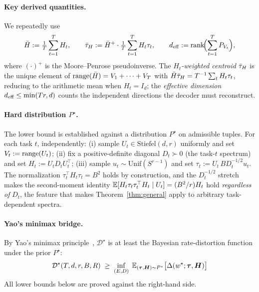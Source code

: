 \paragraph{Key derived quantities.} We repeatedly use
\begin{equation}\label{eq:derived}
  \bar H := \tfrac1T\sum_{t=1}^T H_t,\qquad
  \bar{\tau}_H := \bar H^+\cdot \tfrac1T\sum_{t=1}^T H_t\tau_t,\qquad
  d_{\mathrm{eff}} := \operatorname{rank}\!\Bigl(\sum_{t=1}^T P_{V_t}\Bigr),
\end{equation}
where $(\cdot)^+$ is the Moore--Penrose pseudoinverse. The
\emph{$H_t$-weighted centroid} $\bar{\tau}_H$ is the unique element of
$\operatorname{range}(\bar H) = V_1 + \cdots + V_T$ with $\bar H \bar{\tau}_H =
T^{-1}\sum_t H_t \tau_t$, reducing to the arithmetic mean when
$H_t = I_d$; the \emph{effective dimension} $d_{\mathrm{eff}} \leq \min(Tr, d)$
counts the independent directions the decoder must reconstruct.

\paragraph{Hard distribution $P^\star$.} The lower bound is established
against a distribution $P^\star$ on admissible tuples. For each task
$t$, independently: (i) sample $U_t \in \mathrm{Stiefel}(d, r)$
uniformly and set $V_t := \operatorname{range}(U_t)$; (ii) fix a positive-definite
diagonal $D_t \succ 0$ (the task-$t$ spectrum) and set $H_t := U_t D_t
U_t^\top$; (iii) sample $u_t \sim \mathrm{Unif}(S^{r-1})$ and set
$\tau_t := U_t\, B D_t^{-1/2} u_t$. The normalization
$\tau_t^\top H_t \tau_t = B^2$ holds by construction, and the
$D_t^{-1/2}$ stretch makes the second-moment identity
$\mathbb{E}[H_t \tau_t \tau_t^\top H_t \mid U_t] = (B^2/r) H_t$ hold
\emph{regardless of} $D_t$, the feature that makes
Theorem~\ref{thm:general} apply to arbitrary task-dependent spectra.

\paragraph{Yao's minimax bridge.} By Yao's minimax
principle~\citep{yao1977}, $\mathcal{D}^\star$ is at least the
Bayesian rate-distortion function under the prior $P^\star$:
\begin{equation}\label{eq:yao}
  \mathcal{D}^\star(T,d,r,B,R)
  \;\geq\;
  \inf_{(E,D)}\;\mathbb{E}_{(\boldsymbol\tau,\boldsymbol H)\sim P^\star}
    \bigl[\Delta(w^\star;\boldsymbol\tau,\boldsymbol H)\bigr]
\end{equation}
All lower bounds below are proved against the right-hand side.
